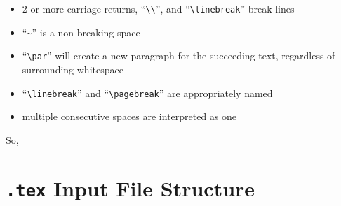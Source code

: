 \begin{itemize}

\item 2 or more carriage returns, ``\texttt{\textbackslash\textbackslash}'', and
  ``\texttt{\textbackslash linebreak}'' break lines

\item ``\texttt{\~}'' is a non-breaking space

\item ``\verb=\par='' will create a new paragraph for the
  succeeding text, regardless of surrounding whitespace

\item ``\verb=\linebreak='' and ``\verb=\pagebreak='' are appropriately
  named

\item multiple consecutive spaces are interpreted as one
\end{itemize}

So, \\



\begin{framed}
  \begin{minipage}{.5\textwidth}
  
  \end{minipage}
\end{framed}


\section{\texttt{.tex} Input File Structure}

